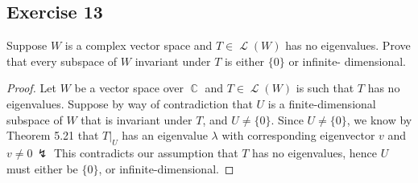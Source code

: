 \documentclass[letterpaper, 12pt]{amsart}
\DeclareMathOperator{\C}{\mathbb{C}}				%
\DeclareMathOperator{\Ell}{\mathscr{L}}				%
\theoremstyle{definition}  							%
\begin{document}
		\subsection*{Exercise 13}
		Suppose $W$ is a complex vector space and $T \in \Ell(W)$ has no eigenvalues. 
		Prove that every subspace of $W$ invariant under $T$ is either $\{ 0 \}$ or infinite- dimensional.

		\begin{proof}
		Let $W$ be a vector space over $\C$ and $T \in \Ell(W)$ is such that $T$ has no eigenvalues.
		Suppose by way of contradiction that $U$ is a finite-dimensional subspace of $W$ that is invariant under $T$, and $U \neq \{0\}$.
		Since $U \neq \{0\}$, we know by Theorem 5.21 that $T|_{U}$ has an eigenvalue $\lambda$ with corresponding eigenvector $v$ and $v \neq 0 \, \lightning$
		This contradicts our assumption that $T$ has no eigenvalues, hence $U$ must either be $\{ 0 \}$, or infinite-dimensional.
		\end{proof}
\end{document}
